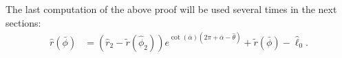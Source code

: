 \documentclass[reqno]{amsart}
\theoremstyle{definition} \newtheorem{definition}{Definition}[section]
\theoremstyle{definition} \newtheorem{remark}[definition]{Remark}
\theoremstyle{plain} \newtheorem{lemma}[definition]{Lemma}
\theoremstyle{plain} \newtheorem{proposition}[definition]{Proposition}
\theoremstyle{plain} \newtheorem{theorem}[definition]{Theorem}
\theoremstyle{plain} \newtheorem{corollary}[definition]{Corollary}
\theoremstyle{definition} \newtheorem{example}[definition]{Example}
\theoremstyle{plain} \newtheorem{claim}[clai]{Claim}
\theoremstyle{definition} \newtheorem{assumption}[definition]{Assumption}
\theoremstyle{definition} \newtheorem{observation}[definition]{Observation}
\newcommand{\1}{\mathbbm 1}
\numberwithin{equation}{section} %
\theoremstyle{plain} \newtheorem*{theorem*}{Theorem}
\theoremstyle{plain} \newtheorem{mthm}[maintheorem]{Main Theorem}
\theoremstyle{plain} \newtheorem*{mthm*}{Main Theorem}
\theoremstyle{plain} \newtheorem*{conjecture*}{Conjecture}
\theoremstyle{plain} \newtheorem{conjecture}[definition]{Conjecture}
\theoremstyle{plain} \newtheorem*{problem*}{Problem}
\begin{document}
The last computation of the above proof will be used several times in the next sections:
\begin{align}
\label{eq:comparaison:Saturated}
\hat r(\bar \phi) &= (\hat r_2 - \tilde r(\hat \phi_2)) e^{\cot(\bar \alpha)(2\pi + \bar \alpha - \hat \theta)} + \tilde r(\bar \phi) - \hat \ell_0.%
\end{align}


%
%
%
%
%
%
%
%
\end{document}
